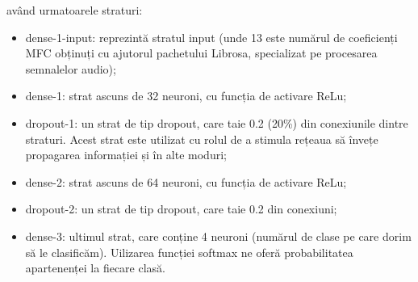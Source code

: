 \documentclass[a4paper,12pt]{report}
\begin{document}
    	având urmatoarele straturi:
    	
    	\begin{itemize}
    		\item dense-1-input: reprezintă stratul input (unde 13 este numărul de coeficienți MFC obținuți cu ajutorul pachetului Librosa, specializat pe procesarea semnalelor audio);
    		\item dense-1: strat ascuns de 32 neuroni, cu funcția de activare ReLu;
    		\item dropout-1: un strat de tip dropout, care taie 0.2 (20\%) din conexiunile dintre straturi. Acest strat este utilizat cu rolul de a stimula rețeaua să învețe propagarea informației și în alte moduri;
    		\item dense-2: strat ascuns de 64 neuroni, cu funcția de activare ReLu;
    		\item dropout-2: un strat de tip dropout, care taie 0.2 din conexiuni;
    		\item dense-3: ultimul strat, care conține 4 neuroni (numărul de clase pe care dorim să le clasificăm). Uilizarea funcției softmax ne oferă probabilitatea apartenenței la fiecare clasă.
    	\end{itemize}
    	
\end{document}

